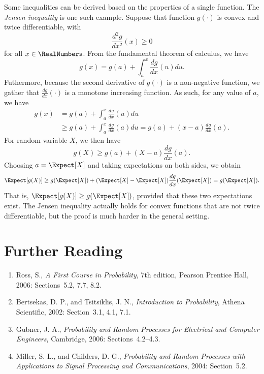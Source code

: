 Some inequalities can be derived based on the properties of a single function.
The \emph{Jensen inequality} is one such example. 
Suppose that function $g(\cdot)$ is convex and twice differentiable, with
\begin{equation*}
\frac{d^2 g}{dx^2} (x) \geq 0
\end{equation*}
for all $x \in \RealNumbers$.
From the fundamental theorem of calculus, we have
\begin{equation*}
g(x) = g(a) + \int_a^x \frac{dg}{dx} (u) du .
\end{equation*}
Futhermore, because the second derivative of $g(\cdot)$ is a non-negative function, we gather that $\frac{dg}{dx} (\cdot)$ is a monotone increasing function.
As such, for any value of $a$, we have
\begin{equation*}
\begin{split}
g(x) &= g(a) + \int_a^x \frac{dg}{dx} (u) du \\
&\geq g(a) + \int_a^x \frac{dg}{dx} (a) du
= g(a) + (x-a) \frac{dg}{dx} (a) .
\end{split}
\end{equation*}
For random variable $X$, we then have
\begin{equation*}
g(X) \geq g(a) + (X-a) \frac{dg}{dx} (a) .
\end{equation*}
Choosing $a = \Expect [X]$ and taking expectations on both sides, we obtain
\begin{equation*}
\Expect [g(X)] \geq g(\Expect [X])
+ (\Expect [X]-\Expect [X]) \frac{dg}{dx} (\Expect [X])
= g(\Expect [X]) .
\end{equation*}
That is, $\Expect [g(X)] \geq g(\Expect [X])$, provided that these two expectations exist.
The Jensen inequality actually holds for convex functions that are not twice differentiable, but the proof is much harder in the general setting.


\section*{Further Reading}

\begin{small}
\begin{enumerate}
\item Ross, S., \emph{A First Course in Probability}, 7th edition, Pearson Prentice Hall, 2006: Sections~5.2, 7.7, 8.2.
\item Bertsekas, D. P., and Tsitsiklis, J. N., \emph{Introduction to Probability}, Athena Scientific, 2002: Section~3.1, 4.1, 7.1.
\item Gubner, J. A., \emph{Probability and Random Processes for Electrical and Computer Engineers}, Cambridge, 2006: Sections~4.2--4.3.
\item Miller, S. L., and Childers, D. G., \emph{Probability and Random Processes with Applications to Signal Processing and Communications}, 2004: Section~5.2.
\end{enumerate}
\end{small}

